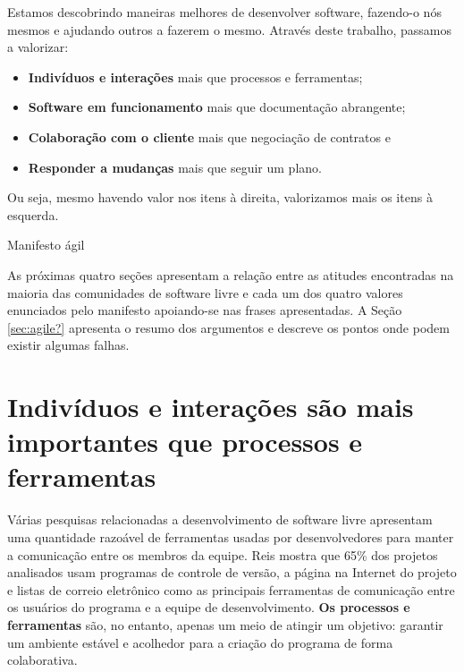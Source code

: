 \begin{caixa}[hb]
  \begin{minipage}{\linewidth}
    \centering Estamos descobrindo maneiras melhores de desenvolver
    software, fazendo-o nós mesmos e ajudando outros a fazerem o
    mesmo. Através deste trabalho, passamos a valorizar:

    \begin{center}
      \begin{itemize}
      \item \textbf{Indivíduos e interações} mais que processos e
        ferramentas;
      \item \textbf{Software em funcionamento} mais que documentação
        abrangente;
      \item \textbf{Colaboração com o cliente} mais que negociação de
        contratos e
      \item \textbf{Responder a mudanças} mais que seguir um plano.
      \end{itemize}
    \end{center}

    Ou seja, mesmo havendo valor nos itens à direita, valorizamos mais
    os itens à esquerda.
  \end{minipage}
  \caption{Manifesto ágil}
  \label{box:manifesto}
\end{caixa}

As próximas quatro seções apresentam a relação entre as atitudes
encontradas na maioria das comunidades de software livre e cada um dos
quatro valores enunciados pelo manifesto apoiando-se nas frases
apresentadas. A Seção \ref{sec:agile?} apresenta o resumo dos
argumentos e descreve os pontos onde podem existir algumas falhas.

\section{Indivíduos e interações são mais importantes que processos e
  ferramentas}
\label{sec:first-princ}

Várias pesquisas relacionadas a desenvolvimento de software livre
apresentam uma quantidade razoável de ferramentas usadas por
desenvolvedores para manter a comunicação entre os membros da
equipe. Reis \cite{Reis2003} mostra que 65\% dos projetos analisados
usam programas de controle de versão, a página na Internet do projeto
e listas de correio eletrônico como as principais ferramentas de
comunicação entre os usuários do programa e a equipe de
desenvolvimento. \textbf{Os processos e ferramentas} são, no entanto,
apenas um meio de atingir um objetivo: garantir um ambiente estável e
acolhedor para a criação do programa de forma colaborativa.

